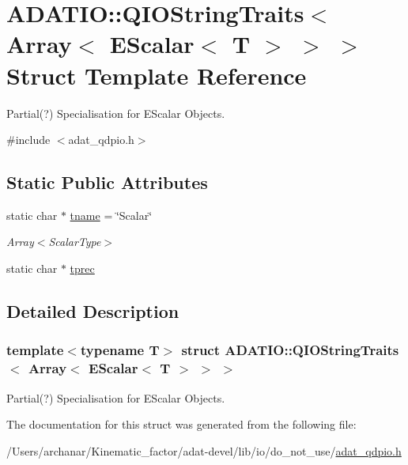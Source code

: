 \hypertarget{structADATIO_1_1QIOStringTraits_3_01Array_3_01EScalar_3_01T_01_4_01_4_01_4}{}\section{A\+D\+A\+T\+IO\+:\+:Q\+I\+O\+String\+Traits$<$ Array$<$ E\+Scalar$<$ T $>$ $>$ $>$ Struct Template Reference}
\label{structADATIO_1_1QIOStringTraits_3_01Array_3_01EScalar_3_01T_01_4_01_4_01_4}


Partial(?) Specialisation for E\+Scalar Objects.  




{\ttfamily \#include $<$adat\+\_\+qdpio.\+h$>$}

\subsection*{Static Public Attributes}
\begin{DoxyCompactItemize}
\item 
static char $\ast$ \mbox{\hyperlink{group__qio_gab84af1dfbd36e1ce7eebd1603b371727}{tname}} = \char`\"{}Scalar\char`\"{}
\begin{DoxyCompactList}\small\item\em Array$<$\+Scalar\+Type$>$ \end{DoxyCompactList}\item 
static char $\ast$ \mbox{\hyperlink{group__qio_ga6aa642ed522f9f49dc8a9eae8abd273a}{tprec}}
\end{DoxyCompactItemize}


\subsection{Detailed Description}
\subsubsection*{template$<$typename T$>$\newline
struct A\+D\+A\+T\+I\+O\+::\+Q\+I\+O\+String\+Traits$<$ Array$<$ E\+Scalar$<$ T $>$ $>$ $>$}

Partial(?) Specialisation for E\+Scalar Objects. 

The documentation for this struct was generated from the following file\+:\begin{DoxyCompactItemize}
\item 
/\+Users/archanar/\+Kinematic\+\_\+factor/adat-\/devel/lib/io/do\+\_\+not\+\_\+use/\mbox{\hyperlink{adat-devel_2lib_2io_2do__not__use_2adat__qdpio_8h}{adat\+\_\+qdpio.\+h}}\end{DoxyCompactItemize}
